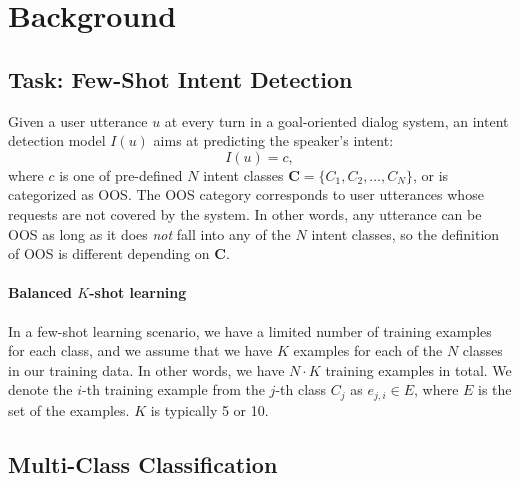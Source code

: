 \section{Background}


\subsection{Task: Few-Shot Intent Detection}
\label{subsec:task-def}

Given a user utterance $u$ at every turn in a goal-oriented dialog system, an intent detection model $I(u)$ aims at predicting the speaker's intent:
\begin{equation}
    I(u) = c,
\end{equation}
where $c$ is one of pre-defined $N$ intent classes $\mathbf{C}=\{C_1, C_2, \ldots, C_N\}$, or is categorized as OOS.
The OOS category corresponds to user utterances whose requests are not covered by the system.
In other words, any utterance can be OOS as long as it does {\it not} fall into any of the $N$ intent classes, so the definition of OOS is different depending on $\mathbf{C}$.

\paragraph{Balanced $K$-shot learning}
In a few-shot learning scenario, we have a limited number of training examples for each class, and we assume that we have $K$ examples for each of the $N$ classes in our training data.
In other words, we have $N\cdot K$ training examples in total.
We denote the $i$-th training example from the $j$-th class $C_j$ as $e_{j,i}\in E$, where $E$ is the set of the examples.
$K$ is typically 5 or 10.


\subsection{Multi-Class Classification}
\label{subsec:classifier}

